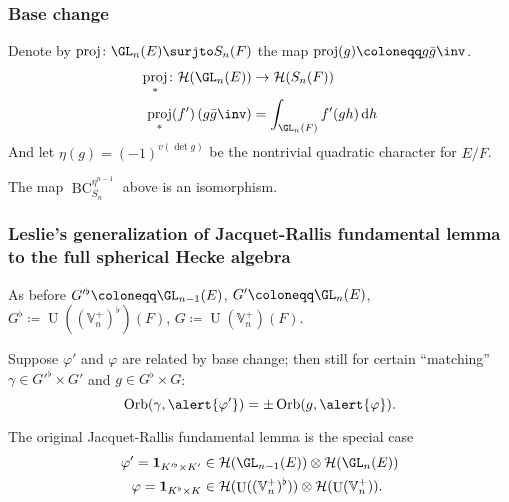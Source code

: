 \documentclass[11pt]{beamer}
\DeclareMathOperator{\BC}{BC}
\DeclareMathOperator{\Orb}{Orb}
\DeclareMathOperator{\Sat}{Satake}
\DeclareMathOperator{\U}{U}
\DeclareMathOperator{\rproj}{proj}
\newcommand{\HH}{\mathcal{H}}
\newcommand{\VV}{\mathbb{V}}
\begin{document}
\begin{frame}[fragile]
  \frametitle{Base change}
  Denote by $\rproj \colon \GL_n(E) \surjto S_n(F)$ the map $\rproj(g) \coloneqq g \bar{g}\inv$.
  \begin{align*}
    \rproj_\ast \colon \HH(\GL_n(E)) &\to \HH(S_n(F)) \\
    \rproj_\ast(f')\left( g\bar{g}\inv \right) &= \int_{\GL_n(F)} f'(gh) \odif h
  \end{align*}
  And let $\eta(g) = (-1)^{v(\det g)}$ be the nontrivial quadratic character for $E/F$.
  \begin{center}
  \end{center}
  \begin{theorem}
    [Leslie 2023]
    The map $\BC_{S_n}^{\eta^{n-1}}$ above is an isomorphism.
  \end{theorem}
\end{frame}


\begin{frame}
  \frametitle{Leslie's generalization of Jacquet-Rallis fundamental lemma to the full spherical Hecke algebra}
  As before $G'^\flat \coloneqq \GL_{n-1}(E)$, $G' \coloneqq \GL_n(E)$,
  $G^\flat \coloneqq \U((\VV_n^+)^\flat)(F)$, $G \coloneqq \U(\VV_n^+)(F)$.

  \begin{theorem}[Leslie 2023]
    Suppose \alert{$\varphi'$ and $\varphi$ are related by base change}; then still
    for certain ``matching'' $\gamma \in G'^\flat \times G'$ and $g \in G^\flat \times G$:
    \[ \Orb(\gamma, \alert{\varphi'}) = \pm \Orb(g, \alert{\varphi}). \]
  \end{theorem}

  The original Jacquet-Rallis fundamental lemma is the special case
  \begin{align*}
    \varphi' = \mathbf{1}_{K'^\flat \times K'} &\in \HH(\GL_{n-1}(E)) \otimes \HH(\GL_n(E)) \\
    \varphi = \mathbf{1}_{K^\flat \times K} &\in \HH(\U((\VV_n^+)^\flat)) \otimes \HH(\U(\VV_n^+)).
  \end{align*}
\end{frame}
\end{document}
